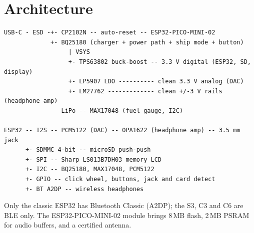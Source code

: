 \documentclass[11pt,a4paper]{article}
\begin{document}
\section{Architecture}
\begin{small}
\begin{verbatim}
USB-C - ESD -+- CP2102N -- auto-reset -- ESP32-PICO-MINI-02
             +- BQ25180 (charger + power path + ship mode + button)
                  | VSYS
                  +- TPS63802 buck-boost -- 3.3 V digital (ESP32, SD, display)
                  +- LP5907 LDO ---------- clean 3.3 V analog (DAC)
                  +- LM27762 ------------- clean +/-3 V rails (headphone amp)
                LiPo -- MAX17048 (fuel gauge, I2C)

ESP32 -- I2S -- PCM5122 (DAC) -- OPA1622 (headphone amp) -- 3.5 mm jack
      +- SDMMC 4-bit -- microSD push-push
      +- SPI -- Sharp LS013B7DH03 memory LCD
      +- I2C -- BQ25180, MAX17048, PCM5122
      +- GPIO -- click wheel, buttons, jack and card detect
      +- BT A2DP -- wireless headphones
\end{verbatim}
\end{small}

Only the classic ESP32 has Bluetooth Classic (A2DP); the S3, C3 and C6 are BLE only.
The ESP32-PICO-MINI-02 module brings 8\,MB flash, 2\,MB PSRAM for audio buffers, and a certified antenna.
\end{document}
